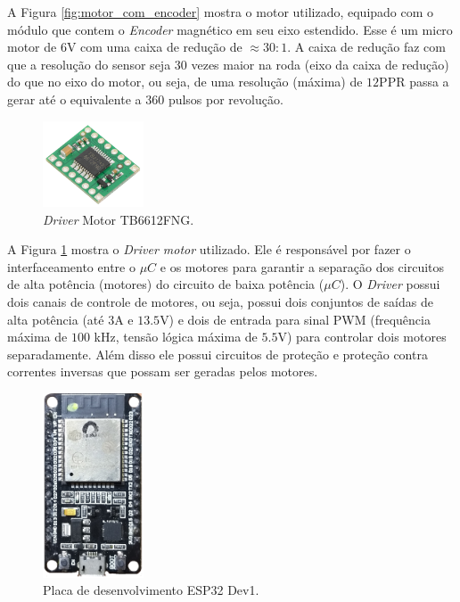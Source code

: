 A Figura \ref{fig:motor_com_encoder} mostra o motor utilizado, equipado com o módulo que contem o \textit{Encoder} magnético em seu eixo estendido. Esse é um micro motor de $6$V com uma caixa de redução de $\approx 30:1$. A caixa de redução faz com que a resolução do sensor seja $30$ vezes maior na roda (eixo da caixa de redução) do que no eixo do motor, ou seja, de uma resolução (máxima) de $12$PPR passa a gerar até o equivalente a $360$ pulsos por revolução.\\

\begin{figure}[H]
    \centering
    \includegraphics[width=3cm]{figuras/eletronica/driver.jpg}
    \caption{\textit{Driver} Motor TB6612FNG.}
    \label{fig:driver_motor}
\end{figure}

A Figura \ref{fig:driver_motor} mostra o \emph{Driver motor} utilizado. Ele é responsável por fazer o interfaceamento entre o $\mu{}C$ e os motores para garantir a separação dos circuitos de alta potência (motores) do circuito de baixa potência ($\mu{}C$). O \emph{Driver} possui dois canais de controle de motores, ou seja, possui dois conjuntos de saídas de alta potência (até $3$A e $13.5$V) e dois de entrada para sinal PWM (frequência máxima de $100$ kHz, tensão lógica máxima de $5.5$V) para controlar dois motores separadamente. Além disso ele possui circuitos de proteção e proteção contra correntes inversas que possam ser geradas pelos motores.\\


\begin{figure}[H]
    \centering
    \includegraphics[width=3cm]{figuras/eletronica/esp32_kit.png}
    \caption{Placa de desenvolvimento ESP32 Dev1.}
    \label{fig:esp32_kit}
\end{figure}

